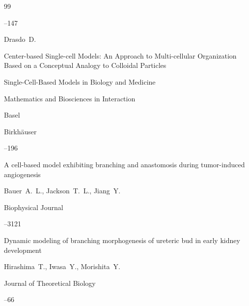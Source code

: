 \begin{thebibliography}{99}



--147 


 

 


\by Drasdo~D.

\paper Center-based Single-cell Models: An Approach to Multi-cellular Organization Based on a Conceptual Analogy to Colloidal Particles	

\inbook Single-Cell-Based Models in Bio\-logy and Medicine

\serial Mathematics and Biosciences in Interaction

\publaddr Basel

\publ Birkh{\"a}user 


--196 


 

 


\paper A cell-based model exhibiting branching and anastomosis during tumor-induced angiogenesis

\by Bauer~A.~L., Jackson~T.~L., Jiang~Y.

\jour Biophysical  Journal




--3121  


 


\paper Dynamic modeling of branching morphogenesis of ureteric bud in early kidney development

\by  Hirashima~T., Iwasa~Y., Morishita~Y.

\jour  Journal of Theoretical Biology




--66



\end{thebibliography}
